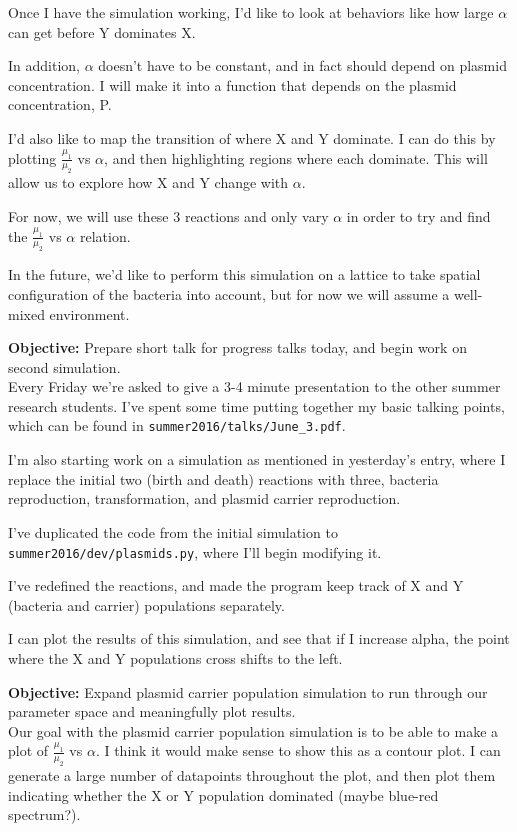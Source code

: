 \documentclass[oneside]{labbook}
\newcommand{\obj}[1]{\textbf{Objective:} #1\\}
\begin{document}
Once I have the simulation working, I'd like to look at behaviors like how large
$\alpha$ can get before Y dominates X.

In addition, $\alpha$ doesn't have to be
constant, and in fact should depend on plasmid concentration. I will make it into
a function that depends on the plasmid concentration, P.

I'd also like to map the transition of where X and Y dominate. I can do this by
plotting $\frac{\mu_1}{\mu_2}$ vs $\alpha$, and then highlighting regions where
each dominate. This will allow us to explore how X and Y change with $\alpha$.

For now, we will use these 3 reactions and only vary $\alpha$ in order to try
and find the $\frac{\mu_1}{\mu_2}$ vs $\alpha$ relation.

In the future, we'd like to perform this simulation on a lattice to take spatial
configuration of the bacteria into account, but for now we will assume a well-mixed
environment.


\obj{Prepare short talk for progress talks today, and begin work on second
simulation.}

Every Friday we're asked to give a 3-4 minute presentation to the other summer
research students. I've spent some time putting together my basic talking points,
which can be found in \texttt{summer2016/talks/June\_3.pdf}.

I'm also starting work on a simulation as mentioned in yesterday's entry, where
I replace the initial two (birth and death) reactions with three, bacteria
reproduction, transformation, and plasmid carrier reproduction.

I've duplicated the code from the initial simulation to
\texttt{summer2016/dev/plasmids.py}, where I'll begin modifying it.

I've redefined the reactions, and made the program keep track of X and Y
(bacteria and carrier) populations separately.

I can plot the results of this simulation, and see that if I increase alpha, the
point where the X and Y populations cross shifts to the left.



\obj{Expand plasmid carrier population simulation to run through our parameter
space and meaningfully plot results.}

Our goal with the plasmid carrier population simulation is to be able to make a
plot of $\frac{\mu_1}{\mu_2}$ vs $\alpha$. I think it would make sense to show
this as a contour plot. I can generate a large number of datapoints throughout
the plot, and then plot them indicating whether the X or Y population dominated
(maybe blue-red spectrum?).
\end{document}
